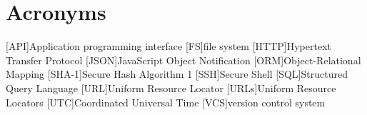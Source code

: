 \chapter*{Acronyms}
\begin{acronym}
    [API]{Application programming interface}
    [FS]{file system}
    [HTTP]{Hypertext Transfer Protocol}
    [JSON]{JavaScript Object Notification}
    [ORM]{Object-Relational Mapping}
    [SHA-1]{Secure Hash Algorithm 1}
    [SSH]{Secure Shell}
    [SQL]{Structured Query Language}
    [URL]{Uniform Resource Locator}
    [URLs]{Uniform Resource Locators}
    [UTC]{Coordinated Universal Time}
    [VCS]{version control system}
\end{acronym}
